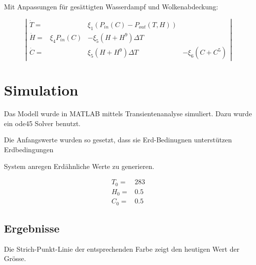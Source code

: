\begin{refsection}
Mit Anpassungen für gesättigten Wasserdampf und Wolkenabdeckung:

\begin{equation}
\left|
\begin{matrix}
\dot{T} = & & \xi_1 \left(P_{in}(C) - P_{out}(T, H) \right) &\\
\dot{H} = & \xi_4 P_{in}(C) & - \xi_5 (H + H^9) \Delta T & \\
\dot{C} = &                 &   \xi_5 (H + H^9) \Delta T & - \xi_6 (C + C^5)
\end{matrix}
\right|
\end{equation}


\section{Simulation}

Das Modell wurde in MATLAB mittels Transientenanalyse simuliert. Dazu wurde ein ode45 Solver benutzt.




Die Anfangswerte wurden so gesetzt, dass sie Erd-Bedinugnen unterstützen  
	Erdbedingungen
	
	System anregen Erdähnliche Werte zu generieren.

\begin{equation}
\begin{matrix}
T_0 = & 283 \\
H_0 = & 0.5 \\
C_0 = & 0.5
\end{matrix}
\end{equation}

\subsection{Ergebnisse}

		Die Strich-Punkt-Linie der entsprechenden Farbe zeigt den heutigen Wert der Grösse. 


\end{refsection}
